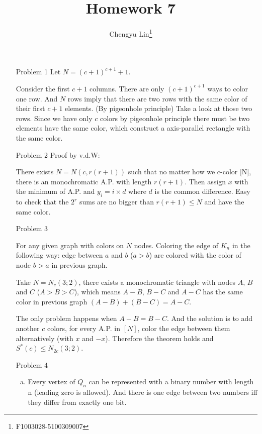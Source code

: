 \documentclass{article}
\title{Homework 7}
\author{Chengyu Lin\footnote{F1003028-5100309007}}
\date{}
\begin{document}
\maketitle

\begin{itemize}
    \item[Problem 1]
        Let $N = (c + 1)^{c + 1} + 1$.

        Consider the first $c + 1$ columns. There are only $(c + 1)^{c + 1}$ ways to color one row.
        And $N$ rows imply that there are two rows with the same color of their first $c + 1$ elements.
        (By pigeonhole principle)
        Take a look at those two rows. Since we have only $c$ colors by pigeonhole principle there must
        be two elements have the same color, which construct a axis-parallel rectangle with the same color.

    \item[Problem 2]
        Proof by v.d.W:

        There exists $N = N(c, r(r + 1))$ such that no matter how we c-color [N], there is an monochromatic
        A.P. with length $r(r + 1)$. Then assign $x$ with the minimum of A.P. and $y_i = i \times d$ where 
        $d$ is the common difference. Easy to check that the $2^r$ sums are no bigger than $r(r + 1) \le N$
        and have the same color.

    \item[Problem 3]

        For any given graph with colors on $N$ nodes. Coloring the edge of $K_n$ in the following way:
        edge between $a$ and $b$ ($a > b$) are colored with the color of node $b > a$ in previous graph.

        Take $N = N_c(3;2)$, there exists a monochromatic triangle with nodes $A$, $B$ and $C$ ($A > B > C$),
        which means $A - B$, $B - C$ and $A - C$ has the same color in previous graph $(A - B) + (B - C) = A - C$.

        The only problem happens when $A - B = B - C$. And the solution is to add another $c$ colors, 
        for every A.P. in $[N]$, color the edge between them alternatively (with $x$ and $-x$).
        Therefore the theorem holds and $S^*(c) \le N_{2c}(3;2)$.

    \item[Problem 4]
        \begin{enumerate}[(a)]
            \item
                Every vertex of $Q_n$ can be represented with a binary number with length n (leading zero is allowed).
                And there is one edge between two numbers iff they differ from exactly one bit.


\end{enumerate}
\end{itemize}
\end{document}
